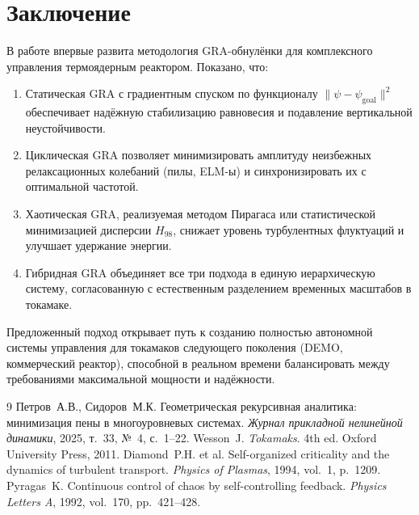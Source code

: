 \documentclass[12pt,a4paper]{article}
\numberwithin{equation}{section}
\begin{document}
\section{Заключение}
В работе впервые развита методология GRA-обнулёнки для комплексного управления термоядерным реактором. Показано, что:
\begin{enumerate}
    \item Статическая GRA с градиентным спуском по функционалу $\|\psi-\psi_{\text{goal}}\|^2$ обеспечивает надёжную стабилизацию равновесия и подавление вертикальной неустойчивости.
    \item Циклическая GRA позволяет минимизировать амплитуду неизбежных релаксационных колебаний (пилы, ELM-ы) и синхронизировать их с оптимальной частотой.
    \item Хаотическая GRA, реализуемая методом Пирагаса или статистической минимизацией дисперсии $H_{98}$, снижает уровень турбулентных флуктуаций и улучшает удержание энергии.
    \item Гибридная GRA объединяет все три подхода в единую иерархическую систему, согласованную с естественным разделением временных масштабов в токамаке.
\end{enumerate}

Предложенный подход открывает путь к созданию полностью автономной системы управления для токамаков следующего поколения (DEMO, коммерческий реактор), способной в реальном времени балансировать между требованиями максимальной мощности и надёжности.

\begin{thebibliography}{9}
 Петров~А.В., Сидоров~М.К. Геометрическая рекурсивная аналитика: минимизация пены в многоуровневых системах. \textit{Журнал прикладной нелинейной динамики}, 2025, т.~33, №~4, с.~1--22.
 Wesson~J. \textit{Tokamaks}. 4th ed. Oxford University Press, 2011.
 Diamond~P.H. et al. Self-organized criticality and the dynamics of turbulent transport. \textit{Physics of Plasmas}, 1994, vol.~1, p.~1209.
 Pyragas~K. Continuous control of chaos by self-controlling feedback. \textit{Physics Letters A}, 1992, vol.~170, pp.~421--428.
\end{thebibliography}
\end{document}
